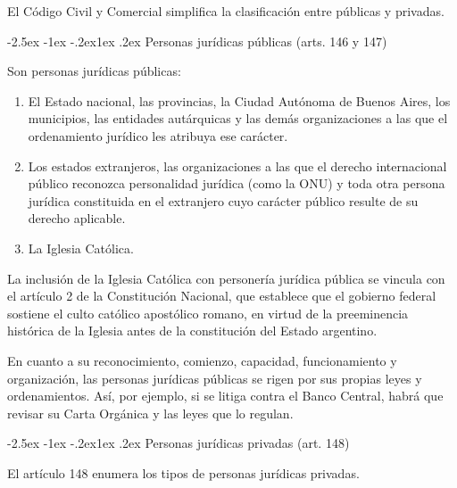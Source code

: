 \documentclass[12pt,oneside]{book}
\makeatletter
\renewcommand\subsection{\@startsection{subsection}{2}{\z@}%
  {-2.5ex \@plus -1ex \@minus -.2ex}{1ex \@plus .2ex}%
  {\normalfont\normalsize\bfseries}}
\makeatother
\begin{document}
El Código Civil y Comercial simplifica la clasificación entre públicas y privadas.

\subsection{Personas jurídicas públicas (arts. 146 y 147)}

\begin{definicion}
Son personas jurídicas públicas:
\begin{enumerate}[label=\alph*)]
    \item El Estado nacional, las provincias, la Ciudad Autónoma de Buenos Aires, los municipios, las entidades autárquicas y las demás organizaciones a las que el ordenamiento jurídico les atribuya ese carácter.
    \item Los estados extranjeros, las organizaciones a las que el derecho internacional público reconozca personalidad jurídica (como la ONU) y toda otra persona jurídica constituida en el extranjero cuyo carácter público resulte de su derecho aplicable.
    \item La Iglesia Católica.
\end{enumerate}
\end{definicion}

La inclusión de la Iglesia Católica con personería jurídica pública se vincula con el artículo 2 de la Constitución Nacional, que establece que el gobierno federal sostiene el culto católico apostólico romano, en virtud de la preeminencia histórica de la Iglesia antes de la constitución del Estado argentino.

En cuanto a su reconocimiento, comienzo, capacidad, funcionamiento y organización, las personas jurídicas públicas se rigen por sus propias leyes y ordenamientos. Así, por ejemplo, si se litiga contra el Banco Central, habrá que revisar su Carta Orgánica y las leyes que lo regulan.

\subsection{Personas jurídicas privadas (art. 148)}

El artículo 148 enumera los tipos de personas jurídicas privadas.
\end{document}
